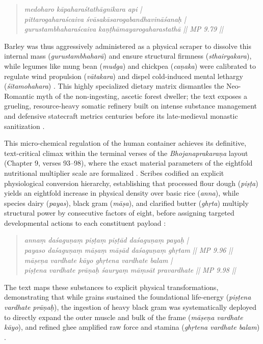 \documentclass[11pt,twoside,letterpaper]{article}
\begin{document}
\begin{quote}
\small
\textit{medoharo kāpaharaśtathāgnikara api | \\
pittarogaharaścaiva śvāsakāsarogabandhavināśanaḥ | \\
gurustambhaharaścaiva kaṇṭhāmayarogaharastathā || MP 9.79 ||}
\end{quote}

Barley was thus aggressively administered as a physical scraper to dissolve this internal mass (\textit{gurustambhaharā}) and ensure structural firmness (\textit{sthairyakara}), while legumes like mung bean (\textit{mudga}) and chickpea (\textit{caṇaka}) were calibrated to regulate wind propulsion (\textit{vātakara}) and dispel cold-induced mental lethargy (\textit{śītamohahara}) \citep{MP_7}. This highly specialized dietary matrix dismantles the Neo-Romantic myth of the non-ingesting, ascetic forest dweller; the text exposes a grueling, resource-heavy somatic refinery built on intense substance management and defensive statecraft metrics centuries before its late-medieval monastic sanitization \citep{MP_7, Wujastyk2025}.

This micro-chemical regulation of the human container achieves its definitive, text-critical climax within the terminal verses of the \textit{Bhojanaprakaraṇa} layout (Chapter 9, verses 93--98), where the exact material parameters of the eightfold nutritional multiplier scale are formalized \citep{MP_7}. Scribes codified an explicit physiological conversion hierarchy, establishing that processed flour dough (\textit{piṣṭa}) yields an eightfold increase in physical density over basic rice (\textit{anna}), while species dairy (\textit{payas}), black gram (\textit{māṣa}), and clarified butter (\textit{ghṛta}) multiply structural power by consecutive factors of eight, before assigning targeted developmental actions to each constituent payload \citep{MP_7}:

\begin{quote}
\small
\textit{annaṃ daśaguṇaṃ piṣṭaṃ piṣṭād daśaguṇaṃ payaḥ | \\
payaso daśaguṇaṃ māṣaṃ māṣād daśaguṇaṃ ghṛtam || MP 9.96 || \\
māṣeṇa vardhate kāyo ghṛtena vardhate balam | \\
piṣṭena vardhate prāṇaḥ śauryaṃ māṃsāt pravardhate || MP 9.98 ||}
\end{quote}

The text maps these substances to explicit physical transformations, demonstrating that while grains sustained the foundational life-energy (\textit{piṣṭena vardhate prāṇaḥ}), the ingestion of heavy black gram was systematically deployed to directly expand the outer muscle and bulk of the frame (\textit{māṣeṇa vardhate kāyo}), and refined ghee amplified raw force and stamina (\textit{ghṛtena vardhate balam}) \citep{MP_7}. 
\end{document}
